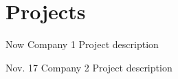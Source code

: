 \documentclass[american]{cv-class}
\begin{document}
\section{Projects}
\begin{entrylist}
	\entry
	{Now}
	{Company 1}
	{\href{https://yourCompany.com/}{ }}
	{\justifying Project description}
	
	\entry
	{Nov. 17}
	{Company 2}
	{\href{https://yourCompany.com/}{ }}
	{\justifying Project description}
	  

\end{entrylist}
\end{document}
